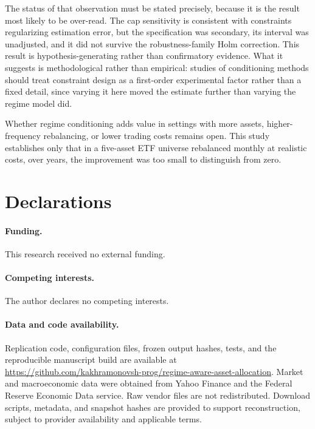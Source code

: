 \documentclass[11pt,letterpaper]{article}
\begin{document}
The status of that observation must be stated precisely, because it is
the result most likely to be over-read. The cap sensitivity is
consistent with constraints regularizing estimation error, but the
specification was secondary, its interval was unadjusted, and it did not
survive the robustness-family Holm correction. This result is
hypothesis-generating rather than confirmatory evidence. What it
suggests is methodological rather
than empirical: studies of conditioning methods should treat constraint
design as a first-order experimental factor rather than a fixed detail,
since varying it here moved the estimate further than varying the regime
model did.

Whether regime conditioning adds value in settings with more assets,
higher-frequency rebalancing, or lower trading costs remains open. This
study establishes only that in a five-asset ETF universe rebalanced
monthly at realistic costs, over \oosYears{} years, the improvement was
too small to distinguish from zero.

\section*{Declarations}

\paragraph{Funding.} This research received no external funding.

\paragraph{Competing interests.} The author declares no competing
interests.

\paragraph{Data and code availability.} Replication code, configuration
files, frozen output hashes, tests, and the reproducible manuscript
build are available at
\url{https://github.com/kakhramonovsh-prog/regime-aware-asset-allocation}.
Market and macroeconomic data were obtained from Yahoo Finance and the
Federal Reserve Economic Data service. Raw vendor files are not
redistributed. Download scripts, metadata, and snapshot hashes are
provided to support reconstruction, subject to provider availability and
applicable terms.
\end{document}
